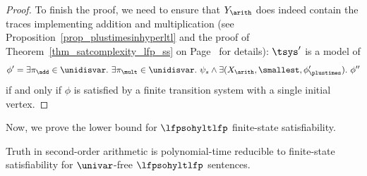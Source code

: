\begin{proof}
To finish the proof, we need to ensure that $Y_\arith$ does indeed contain the traces implementing addition and multiplication (see Proposition~\ref{prop_plustimesinhyperltl} and the proof of Theorem~\ref{thm_satcomplexity_lfp_ss} on Page~\pageref{pageref_plustimesaslfp} for details): $\tsys'$ is a model of 
\[
\phi' = \exists \pi_\add \in \unidisvar.\ \exists \pi_\mult \in \unidisvar.\ \psi_s \wedge \exists(X_\arith, \smallest, \phi_\plustimes').\ \phi''
\]
if and only if $\phi$ is satisfied by a finite transition system with a single initial vertex.
\end{proof}

Now, we prove the lower bound for $\lfpsohyltlfp$ finite-state satisfiability.

\begin{lem}
\label{lemma_fssat_soahard}
Truth in second-order arithmetic is polynomial-time reducible to finite-state satisfiability for $\univar$-free $\lfpsohyltlfp$ sentences.
\end{lem}

